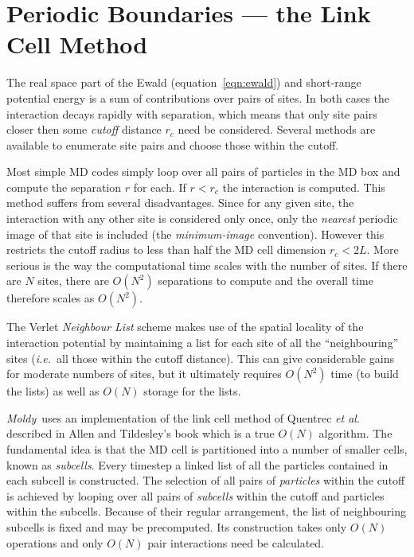 \documentclass[a4paper,twoside]{report}
\newcommand{\moldy}{\emph{Moldy}}
\newcommand{\ie}{\emph{i.e.}}
\begin{document}
\section{Periodic Boundaries --- the Link Cell Method}%
\label{sec:link-cell}
The real space part of the Ewald (equation~\ref{eqn:ewald}) and
short-range potential energy is a sum of contributions over pairs of
sites.  In both cases the interaction decays rapidly with separation,
which means that only site pairs closer then some \emph{cutoff} distance
$r_c$ need be considered.  Several methods are available to enumerate
site pairs and choose those within the cutoff.

Most simple MD codes simply loop over all pairs of particles in the MD
box and compute the separation $r$ for each.  If $r < r_c$ the
interaction is computed.  This method suffers from several
disadvantages.  Since for any given site, the interaction with any
other site is considered only once, only the \emph{nearest} periodic
image of that site is included (the \emph{minimum-image} convention).
However this restricts the cutoff radius to less than half the MD cell
dimension $r_c < 2L$.  More serious is the way the computational
time scales with the number of sites.  If there are $N$ sites, there
are $O(N^2)$ separations to compute and the overall time therefore scales
as $O(N^2)$.

The Verlet \emph{Neighbour List} scheme\cite[pp 146-149]{allen:87} makes
use of the spatial locality of the interaction potential by
maintaining a list for each site of all the ``neighbouring'' sites
(\ie\ all those within the cutoff distance).  This can give
considerable gains for moderate numbers of sites, but it ultimately
requires $O(N^2)$ time (to build the lists) as well as $O(N)$ storage for
the lists.

\moldy\ uses an implementation of the link cell method of Quentrec
\emph{et al}.\cite{quentrec:75} described in Allen and Tildesley's
book\cite[pp 149-152]{allen:87} which is a true $O(N)$ algorithm.  The
fundamental idea is that the MD cell is partitioned into a number of
smaller cells, known as \emph{subcells}.  Every timestep a linked list
of all the particles contained in each subcell is constructed.  The
selection of all pairs of \emph{particles} within the cutoff is
achieved by looping over all pairs of \emph{subcells} within the
cutoff and particles within the subcells.  Because of their regular
arrangement, the list of neighbouring subcells is fixed and may be
precomputed.  Its construction takes only $O(N)$ operations and only
$O(N)$ pair interactions need be calculated.
\end{document}
